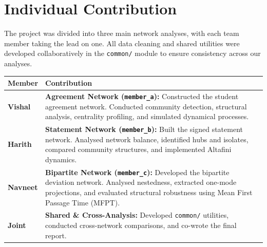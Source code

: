 \documentclass[10pt,a4paper]{article}
\begin{document}
\section{Individual Contribution}

The project was divided into three main network analyses, with each team member taking the lead on one. All data cleaning and shared utilities were developed collaboratively in the \texttt{common/} module to ensure consistency across our analyses.

\begin{table}[!htbp]
\centering
\small
\begin{tabular}{@{}lp{12.5cm}@{}}
\toprule
\textbf{Member} & \textbf{Contribution} \\
\midrule
\textbf{Vishal} & \textbf{Agreement Network (\texttt{member\_a}):} Constructed the student agreement network. Conducted community detection, structural analysis, centrality profiling, and simulated dynamical processes. \\
\addlinespace
\textbf{Harith} & \textbf{Statement Network (\texttt{member\_b}):} Built the signed statement network. Analysed network balance, identified hubs and isolates, compared community structures, and implemented Altafini dynamics. \\
\addlinespace
\textbf{Navneet} & \textbf{Bipartite Network (\texttt{member\_c}):} Developed the bipartite deviation network. Analysed nestedness, extracted one-mode projections, and evaluated structural robustness using Mean First Passage Time (MFPT). \\
\addlinespace
\textbf{Joint} & \textbf{Shared \& Cross-Analysis:} Developed \texttt{common/} utilities, conducted cross-network comparisons, and co-wrote the final report. \\
\bottomrule
\end{tabular}
\end{table}
\end{document}
